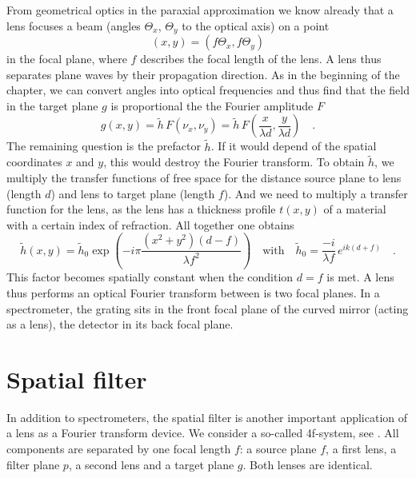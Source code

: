 From geometrical optics in the paraxial approximation we know already that a lens focuses a beam  (angles $\Theta_x$, $\Theta_y$ to the optical axis) on a point 
\begin{equation}
(x,y) = (f \Theta_x, f \Theta_y)
\end{equation}
in the focal plane, where $f$ describes the focal length of the lens. A lens thus separates plane waves by their propagation direction. As in the beginning of the chapter, we can convert angles into optical frequencies and thus find that the field in the target plane $g$ is proportional the the Fourier amplitude $F$
\begin{equation}
    g(x,y) = \tilde{h} \,   F \left( \nu_x,\nu_y \right) = \tilde{h} \,  F \left( \frac{x}{\lambda d}, \frac{y}{\lambda d} \right) \quad .
\end{equation}
The remaining question is the prefactor $\tilde{h}$. If it would depend of the spatial coordinates $x$ and $y$, this would destroy the Fourier transform. To obtain $\tilde{h}$, we multiply the transfer functions of free space for the distance source plane to lens (length $d$) and lens to target plane (length $f$). And we need to multiply a transfer function for the lens, as the lens has a thickness profile $t(x,y)$ of a material with a certain index of refraction. All together one obtains
\begin{equation}
    \tilde{h}(x,y) =  \tilde{h}_0 \exp \left( 
- i \pi \frac{(x^2 + y^2)(d-f)}{\lambda f^2}
    \right) \quad \text{with} \quad  \tilde{h}_0  = \frac{-i}{\lambda f} \, e^{ik (d+f)} \quad .
\end{equation}
This factor becomes spatially constant when the condition $d=f$ is met. A lens thus performs an optical Fourier transform between is two focal planes. In a spectrometer, the grating sits in the front focal plane of the curved mirror (acting as a lens), the detector in its back focal plane.



\section{Spatial filter}


In addition to spectrometers, the spatial filter is another important application of a lens as a Fourier transform device. We consider a so-called 4f-system, see \cite{SalehTeich1991}. All components are separated by one focal length $f$: a source plane $f$, a first lens, a filter plane $p$, a second lens and a target plane $g$. Both lenses are identical. 

